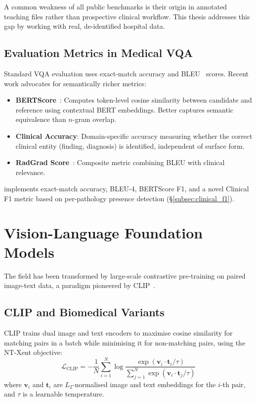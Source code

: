 \noindent
A common weakness of all public benchmarks is their origin in annotated
teaching files rather than prospective clinical workflow. This thesis
addresses this gap by working with real, de-identified hospital data.

\subsection{Evaluation Metrics in Medical VQA}
\label{subsec:metrics_lit}

Standard VQA evaluation uses exact-match accuracy and BLEU~\citep{papineni2002bleu}
scores. Recent work advocates for semantically richer metrics:

\begin{itemize}
  \item \textbf{BERTScore}~\citep{zhang2020bertscore}: Computes token-level
        cosine similarity between candidate and reference using contextual
        BERT embeddings. Better captures semantic equivalence than $n$-gram
        overlap.
  \item \textbf{Clinical Accuracy}: Domain-specific accuracy measuring
        whether the correct clinical entity (finding, diagnosis) is
        identified, independent of surface form.
  \item \textbf{RadGrad Score}~\citep{abacha2019question}: Composite metric
        combining BLEU with clinical relevance.
\end{itemize}

\medxplain{} implements exact-match accuracy, BLEU-4, BERTScore F1, and a
novel Clinical F1 metric based on per-pathology presence detection
(\S\ref{subsec:clinical_f1}).

\section{Vision-Language Foundation Models}
\label{sec:lit_vlm}

The field has been transformed by large-scale contrastive pre-training on
paired image-text data, a paradigm pioneered by CLIP~\citep{radford2021clip}.

\subsection{CLIP and Biomedical Variants}
\label{subsec:clip}

CLIP trains dual image and text encoders to maximise cosine similarity for
matching pairs in a batch while minimising it for non-matching pairs,
using the NT-Xent objective:
\begin{equation}
\mathcal{L}_{\mathrm{CLIP}} = -\frac{1}{N} \sum_{i=1}^{N}
\log \frac{\exp(\bm{v}_i \cdot \bm{t}_i / \tau)}
          {\sum_{j=1}^{N} \exp(\bm{v}_i \cdot \bm{t}_j / \tau)}
\label{eq:ntxent}
\end{equation}
where $\bm{v}_i$ and $\bm{t}_i$ are $L_2$-normalised image and text
embeddings for the $i$-th pair, and $\tau$ is a learnable temperature.

